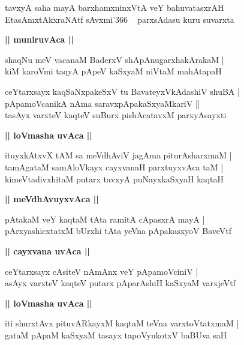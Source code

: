 \documentclass[twoside,12pt,openright]{book}
\newcounter{shloka}[chapter]
\def\uvaca#1{\centerline{{\large\textbf{#1}}}}
\begin{document}
\begin{shloka}%
tavxyA saha mayA barxhamxninxVtA veY bahuvatasxrAH \\
EtasAmxtAkxraNAtf sAvxmi\char'366 ~ parxsAdasu kuru suvarxta
\end{shloka}

\uvaca{|| muniruvAca ||}

\begin{shloka}%
shaqNu meV vacanaM BaderxV shApAnugarxhakArakaM |\\
kiM karoVmi taqyA pApeV kaSxyaM niVtaM mahAtapaH
\end{shloka}

\begin{shloka}%
ceYtarxsayx kaqSaNxpakeSxV tu BavateyxVkAdashiV shuBA |\\
pApamoVcanikA nAma saravxpApakaSxyaMkariV ||\\
tasAyx varxteV kaqteV suBurx pishAcatavxM parxyAsayxti
\end{shloka}

\uvaca{|| loVmasha uvAca ||}

\begin{shloka}%
ituyxkAtxvX tAM sa meVdhAviV jagAma piturAsharxmaM |\\
tamAgataM samAloVkayx cayxvanaH parxtuyxvAca taM |\\
kimeVtadivxhitaM putarx tavxyA puNayxkaSxyaH kaqtaH 
\end{shloka}

\uvaca{|| meVdhAvuyxvAca ||}

\begin{shloka}%
pAtakaM veY kaqtaM tAta ramitA cApasxrA mayA |\\
pArxyashicxtatxM bUrxhi tAta yeVna pApakasxyoV BaveVtf 
\end{shloka}

\uvaca{|| cayxvana uvAca ||}

\begin{shloka}%
ceYtarxsayx cAsiteV nAmAnx veY pApamoVciniV |\\
asAyx varxteV kaqteV putarx pAparAshiH kaSxyaM varxjeVtf
\end{shloka}

\uvaca{|| loVmasha uvAca ||}

\begin{shloka}%
iti shurxtAvx pituvARkayxM kaqtaM teVna varxtoVtatxmaM |\\
gataM pApaM kaSxyaM tasayx tapoVyukotxV baBUva saH 
\end{shloka}
\end{document}
